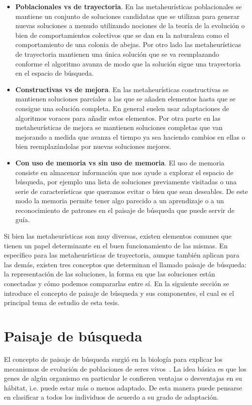 \begin{itemize}
    \item \textbf{Poblacionales vs de trayectoria}. En las metaheurísticas poblacionales se mantiene un conjunto de soluciones candidatas que se utilizan para generar nuevas soluciones a menudo utilizando nociones de la teoría de la evolución o bien de comportamientos colectivos que se dan en la naturaleza como el comportamiento de una colonia de abejas. Por otro lado las metaheurísticas de trayectoria mantienen una única solución que se va reemplazando conforme el algoritmo avanza de modo que la solución sigue una trayectoria en el espacio de búsqueda.
    \item \textbf{Constructivas vs de mejora}. En las metaheurísticas constructivas se mantienen soluciones parciales a las que se añaden elementos hasta que se consigue una solución completa. En general suelen usar adaptaciones de algoritmos voraces para añadir estos elementos. Por otra parte en las metaheurísticas de mejora se mantienen soluciones completas que van mejorando a medida que avanza el tiempo ya sea haciendo cambios en ellas o bien reemplazándolas por nuevas soluciones mejores.
    \item \textbf{Con uso de memoria vs sin uso de memoria}. El uso de memoria consiste en almacenar información que nos ayude a explorar el espacio de búsqueda, por ejemplo una lista de soluciones previamente visitadas o una serie de características que queramos evitar o bien que sean deseables. De este modo la memoria permite tener algo parecido a un aprendizaje o a un reconocimiento de patrones en el paisaje de búsqueda que puede servir de guía.
\end{itemize} 

Si bien las metaheurísticas son muy diversas, existen elementos comunes que tienen un papel determinante en el buen funcionamiento de las mismas. 
%
En específico para las metaheurísticas de trayectoria, aunque también aplican para las demás, existen tres conceptos que determinan el llamado paisaje de búsqueda: 
la representación de las soluciones, la forma en que las soluciones están conectadas y cómo podemos compararlas entre sí. 
%
En la siguiente sección se introduce el concepto de paisaje de búsqueda y sus componentes, el cual es el principal tema de estudio de esta tesis.

\section{Paisaje de búsqueda}
El concepto de paisaje de búsqueda surgió en la biología para explicar los mecanismos de evolución de poblaciones de seres vivos~\cite{wright1932roles}. 
%
La idea básica es que los genes de algún organismo en particular le confieren ventajas o desventajas en su hábitat, i.e. puede estar más o menos adaptado. 
%
De esta manera puede pensarse en clasificar a todos los individuos de acuerdo a su grado de adaptación. 

